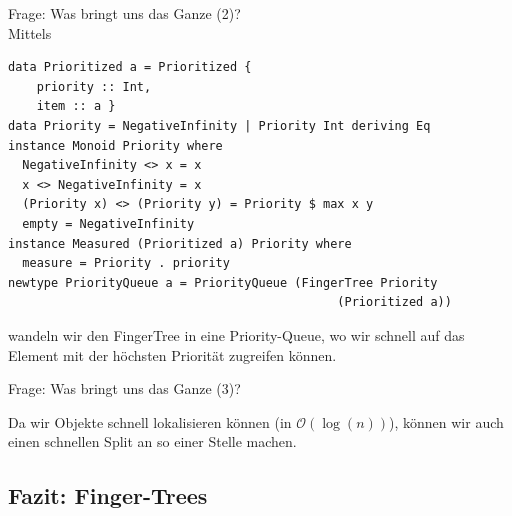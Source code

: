 \documentclass{beamer}
\begin{document}
\begin{frame}[fragile]
Frage: Was bringt uns das Ganze (2)?\\\pause
Mittels
\begin{verbatim}
data Prioritized a = Prioritized {
    priority :: Int,
    item :: a }
data Priority = NegativeInfinity | Priority Int deriving Eq
instance Monoid Priority where
  NegativeInfinity <> x = x
  x <> NegativeInfinity = x
  (Priority x) <> (Priority y) = Priority $ max x y
  empty = NegativeInfinity
instance Measured (Prioritized a) Priority where
  measure = Priority . priority
newtype PriorityQueue a = PriorityQueue (FingerTree Priority
                                              (Prioritized a))
\end{verbatim}
wandeln wir den FingerTree in eine Priority-Queue, wo wir schnell auf das Element mit der höchsten Priorität zugreifen können.
\end{frame}

\begin{frame}[fragile]
Frage: Was bringt uns das Ganze (3)?\pause\bigskip

Da wir Objekte schnell lokalisieren können (in $\mathcal{O}(\log(n))$), können wir auch einen schnellen Split an so einer Stelle machen.
\end{frame}

\subsection{Fazit: Finger-Trees}
\end{document}
